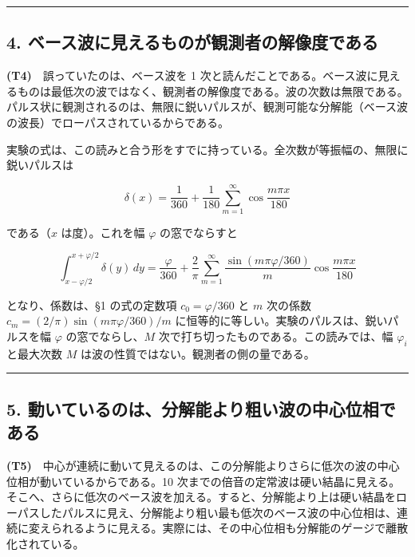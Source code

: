 \documentclass[
  a4paper,
]{ltjsarticle}
\begin{document}
\begin{center}\rule{0.5\linewidth}{0.5pt}\end{center}

\subsection{4.
ベース波に見えるものが観測者の解像度である}\label{ux30d9ux30fcux30b9ux6ce2ux306bux898bux3048ux308bux3082ux306eux304cux89b3ux6e2cux8005ux306eux89e3ux50cfux5ea6ux3067ux3042ux308b}

\textbf{(T4)}　誤っていたのは、ベース波を 1
次と読んだことである。ベース波に見えるものは最低次の波ではなく、観測者の解像度である。波の次数は無限である。パルス状に観測されるのは、無限に鋭いパルスが、観測可能な分解能（ベース波の波長）でローパスされているからである。

実験の式は、この読みと合う形をすでに持っている。全次数が等振幅の、無限に鋭いパルスは

\[
\delta(x)=\frac{1}{360}+\frac{1}{180}\sum_{m=1}^{\infty}\cos\frac{m\pi x}{180}
\]

である（\(x\) は度）。これを幅 \(\varphi\) の窓でならすと

\[
\int_{x-\varphi/2}^{x+\varphi/2}\delta(y)\,dy=\frac{\varphi}{360}+\frac{2}{\pi}\sum_{m=1}^{\infty}\frac{\sin(m\pi\varphi/360)}{m}\cos\frac{m\pi x}{180}
\]

となり、係数は、§1 の式の定数項 \(c_0=\varphi/360\) と \(m\) 次の係数
\(c_m=(2/\pi)\sin(m\pi\varphi/360)/m\)
に恒等的に等しい。実験のパルスは、鋭いパルスを幅 \(\varphi\)
の窓でならし、\(M\) 次で打ち切ったものである。この読みでは、幅
\(\varphi_i\) と最大次数 \(M\)
は波の性質ではない。観測者の側の量である。

\begin{center}\rule{0.5\linewidth}{0.5pt}\end{center}

\subsection{5.
動いているのは、分解能より粗い波の中心位相である}\label{ux52d5ux3044ux3066ux3044ux308bux306eux306fux5206ux89e3ux80fdux3088ux308aux7c97ux3044ux6ce2ux306eux4e2dux5fc3ux4f4dux76f8ux3067ux3042ux308b}

\textbf{(T5)}　中心が連続に動いて見えるのは、この分解能よりさらに低次の波の中心位相が動いているからである。10
次までの倍音の定常波は硬い結晶に見える。そこへ、さらに低次のベース波を加える。すると、分解能より上は硬い結晶をローパスしたパルスに見え、分解能より粗い最も低次のベース波の中心位相は、連続に変えられるように見える。実際には、その中心位相も分解能のゲージで離散化されている。
\end{document}
